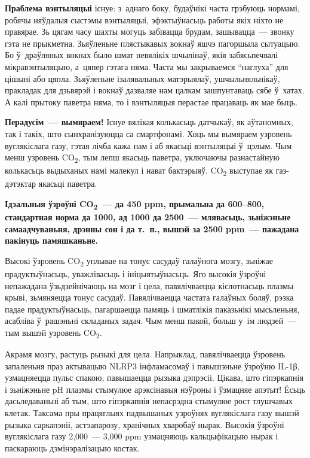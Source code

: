 \textbf{Праблема вэнтыляцыі} існуе: з~аднаго боку, будаўнікі часта грэбуюць нормамі, робячы няўдалыя сыстэмы вэнтыляцыі, эфэктыўнасьць работы якіх ніхто не правярае. Зь цягам часу шахты могуць забівацца брудам, зашывацца~--- звонку гэта не прыкметна. Зьяўленьне плястыкавых вокнаў яшчэ пагоршыла сытуацыю. Бо ў~драўляных вокнах было шмат невялікіх шчылінаў, якія забясьпечвалі мікравэнтыляцыю, а~цяпер гэтага няма. Часта мы закрываемся ``наглуха'' для цішыні або цяпла. Зьяўленьне ізалявальных матэрыялаў, ушчыльняльнікаў, пракладак для дзьвярэй і вокнаў дазваляе нам цалкам зашпунтаваць сябе ў~хатах. А калі прытоку паветра няма, то і вэнтыляцыя перастае працаваць як мае быць.

\textbf{Перадусім~--- вымяраем!} Існуе вялікая колькасьць датчыкаў, як аўтаномных, так і такіх, што сынхранізуюцца са смартфонамі. Хоць мы вымяраем узровень вуглякіслага газу, гэтая лічба кажа нам і аб якасьці вэнтыляцыі ў~цэлым. Чым менш узровень CO\textsubscript{2}, тым лепш якасьць паветра, уключаючы разнастайную колькасьць выдыханых намі малекул і нават бактэрыяў. CO\textsubscript{2} выступае як газ-дэтэктар якасьці паветра.

\textbf{Ідэальныя ўзроўні CO\textsubscript{2}~--- да 450 ppm, прымальна да 600--800, стандартная норма да 1000, ад 1000 да 2500~--- млявасьць, зьніжэньне самаадчуваньня, дрэнны сон і да т.~п., вышэй за 2500 ppm~--- пажадана пакінуць памяшканьне.}

Высокі ўзровень CO\textsubscript{2} уплывае на тонус сасудаў галаўнога мозгу, зьніжае прадуктыўнасьць, уважлівасьць і ініцыятыўнасьць. Яго высокія ўзроўні непажадана ўзьдзейнічаюць на мозг і цела, павялічваецца кіслотнасьць плазмы крыві, зьмяняецца тонус сасудаў. Павялічваецца частата галаўных боляў, рэзка падае прадуктыўнасьць, пагаршаецца памяць і шматлікія паказьнікі мысьленьня, асабліва ў~рашэньні складаных задач. Чым менш пакой, больш у~ім людзей~--- тым вышэй узровень CO\textsubscript{2}.

Акрамя мозгу, растуць рызыкі для цела. Напрыклад, павялічваецца ўзровень запаленьня праз актывацыю NLRP3 інфламасомаў і павышэньне ўзроўню IL-1β, узмацняецца пульс спакою, павышаецца рызыка дэпрэсіі. Цікава, што гіпэркапнія і зьніжэньне pH плазмы стымулюе арэксінавыя нэўроны і ўзмацняе апэтыт! Ёсьць дасьледаваньні аб тым, што гіпэркапнія непасрэдна стымулюе рост тлушчавых клетак. Таксама пры працяглыях падвышаных узроўнях вуглякіслага газу вышэй рызыка саркапэніі, астэапарозу, хранічных хваробаў нырак. Высокія ўзроўні вуглякіслага газу 2,000~--- 3,000 ppm узмацняюць кальцыфікацыю нырак і паскараюць дэмінэралізацыю костак.

